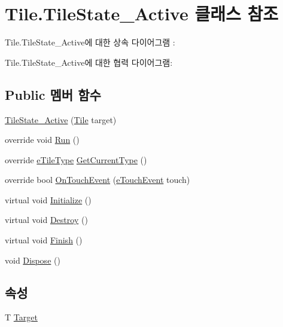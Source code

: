 \hypertarget{class_tile_1_1_tile_state___active}{}\section{Tile.\+Tile\+State\+\_\+\+Active 클래스 참조}
\label{class_tile_1_1_tile_state___active}


Tile.\+Tile\+State\+\_\+\+Active에 대한 상속 다이어그램 \+: 


Tile.\+Tile\+State\+\_\+\+Active에 대한 협력 다이어그램\+:
\subsection*{Public 멤버 함수}
\begin{DoxyCompactItemize}
\item 
\hyperlink{class_tile_1_1_tile_state___active_a89b45a1d74fe0e384f9cc8960f29d86a}{Tile\+State\+\_\+\+Active} (\hyperlink{class_tile}{Tile} target)
\item 
override void \hyperlink{class_tile_1_1_tile_state___active_ab53c7c818d65122d6d36c9681ca53bf9}{Run} ()
\item 
override \hyperlink{_tile_8cs_a271bc07be325bca511bcb747e0ff2fda}{e\+Tile\+Type} \hyperlink{class_tile_1_1_tile_state___active_afdc52754ce22e231c691a52d213dd92d}{Get\+Current\+Type} ()
\item 
override bool \hyperlink{class_tile_1_1_tile_state___active_a7a9e2832931f69884ee0d9917ab619a8}{On\+Touch\+Event} (\hyperlink{_touch_manager_8cs_ae33e321a424fe84ba8b2fdb81ad40a68}{e\+Touch\+Event} touch)
\item 
virtual void \hyperlink{class_f_z_1_1_state_a27ac6fd2e844476017b35aa781d73c8c}{Initialize} ()
\item 
virtual void \hyperlink{class_f_z_1_1_state_aa85fdf4a5495d6d5d3ed4aeda3497c8a}{Destroy} ()
\item 
virtual void \hyperlink{class_f_z_1_1_state_a288bb8c3fceee4bf03f01e295dcef1be}{Finish} ()
\item 
void \hyperlink{class_f_z_1_1_state_a598887d3fbb412fada132dc1c079b25b}{Dispose} ()
\end{DoxyCompactItemize}
\subsection*{속성}
\begin{DoxyCompactItemize}
\item 
T \hyperlink{class_f_z_1_1_state_a6927f5c9f2517052f9dc5596188e9d95}{Target}
\end{DoxyCompactItemize}
